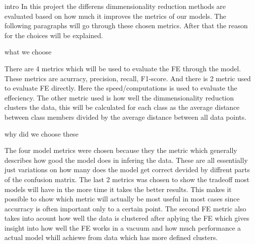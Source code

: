 intro
In this project the differens dimmensionality reduction methods are evaluated based on how much it improves the metrics of our models.
The following paragraphs will go through these chosen metrics.
After that the reason for the choices will be explained.

what we choose 

There are 4 metrics which will be used to evaluate the FE through the model. These metrics are acurracy, precision, recall, F1-score. And there is 2 metric used to evaluate FE directly.
Here the speed/computations is used to evaluate the effeciency. The other metric used is how well the dimmensionality reduction clusters the data, this will be calculated for each class
as the average distance between class members divided by the average distance between all data points.

why did we choose these

The four model metrics were chosen because they the metric which generally describes how good the model does in infering the data. These are all essentially just variations on 
how many does the model get correct devided by diffrent parts of the confusion matrix.
The last 2 metrics was chosen to show the tradeoff most models will have in the more time it takes the better results. This makes it possible to show which metric will actually be most useful
in most cases since accurracy is often important only to a certain point. The second FE metric also takes into acount how well the data is clustered after aplying the FE which gives
insight into how well the FE works in a vacuum and how much performance a actual model whill achiewe from data which has more defined clusters.